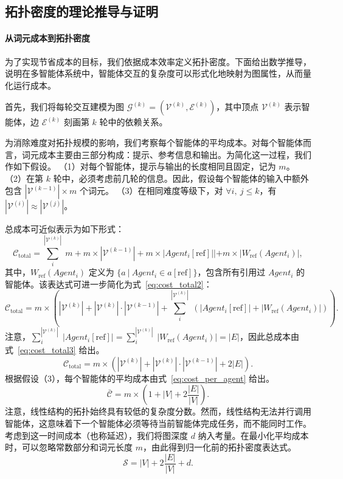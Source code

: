 \documentclass{article}
\theoremstyle{definition}
\begin{document}
\subsection{拓扑密度的理论推导与证明}
\label{appendix:density}

\paragraph{从词元成本到拓扑密度}
为了实现节省成本的目标，我们依据成本效率定义拓扑密度。下面给出数学推导，说明在多智能体系统中，智能体交互的复杂度可以形式化地映射为图属性，从而量化运行成本。

首先，我们将每轮交互建模为图 \( \mathcal{G}^{(k)} = (\mathcal{V}^{(k)}, \mathcal{E}^{(k)}) \)，其中顶点 \( \mathcal{V}^{(k)} \) 表示智能体，边 \( \mathcal{E}^{(k)} \) 刻画第 $k$ 轮中的依赖关系。

为消除难度对拓扑规模的影响，我们考察每个智能体的平均成本。对每个智能体而言，词元成本主要由三部分构成：提示、参考信息和输出。为简化这一过程，我们作如下假设。
（1）对每个智能体，提示与输出的长度相同且固定，记为 $m$。
（2）在第 $k$ 轮中，必须考虑前几轮的信息。因此，假设每个智能体的输入中额外包含 $|\mathcal{V}^{(k-1)}| \times m$ 个词元。
（3）在相同难度等级下，对 $\forall i,\ j \leq k$，有 $|\mathcal{V}^{(i)}| \approx |\mathcal{V}^{(j)}|$。

总成本可近似表示为如下形式：
\begin{equation}\label{eq:cost_total}
\mathcal{C}_{\text{total}} = \sum_{i}^{|\mathcal{V}^{(k)}|} \; m + m \times |\mathcal{V}^{(k-1)}| + m \times |Agent_i[\text{ref}]|| + m \times |W_{\text{ref}}(Agent_i)|,
\end{equation}
其中，$W_{\text{ref}}(Agent_i)$ 定义为 $\{ a\ |\ Agent_i \in a[\text{ref}] \}$，包含所有引用过 $Agent_i$ 的智能体。该表达式可进一步简化为式~\ref{eq:cost_total2}：
\begin{equation}\label{eq:cost_total2}
\mathcal{C}_{\text{total}} = m \times (|\mathcal{V}^{(k)}| + |\mathcal{V}^{(k)}| \cdot |\mathcal{V}^{(k-1)}| + \sum^{|\mathcal{V}^{(k)}|}_i\;(|Agent_i[\text{ref}]| + |W_{\text{ref}}(Agent_i)|)).
\end{equation}
注意，\(\sum^{|\mathcal{V}^{(k)}|}_i\;|Agent_i[\text{ref}]| =\sum^{|\mathcal{V}^{(k)}|}_i\;|W_{\text{ref}}(Agent_i)|=|E|\)，因此总成本由式~\ref{eq:cost_total3} 给出。
\begin{equation}\label{eq:cost_total3}
\mathcal{C}_{\text{total}} = m \times (|\mathcal{V}^{(k)}| + |\mathcal{V}^{(k)}| \cdot |\mathcal{V}^{(k-1)}| + 2|E|).
\end{equation}
根据假设（3），每个智能体的平均成本由式~\ref{eq:cost_per_agent} 给出。
\begin{equation}\label{eq:cost_per_agent}
\mathcal{\bar C} = m \times (1 + |V| + 2\frac{|E|}{|V|}).
\end{equation}
注意，线性结构的拓扑始终具有较低的复杂度分数。然而，线性结构无法并行调用智能体，这意味着下一个智能体必须等待当前智能体完成任务，而不能同时工作。考虑到这一时间成本（也称延迟），我们将图深度 $d$ 纳入考量。在最小化平均成本时，可以忽略常数部分和词元长度 $m$，由此得到归一化前的拓扑密度表达式。
\begin{equation}\label{eq:topo_density_tmp}
\mathcal{S} = |V| + 2\frac{|E|}{|V|} + d.
\end{equation}
\end{document}
